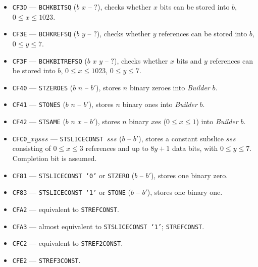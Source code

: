 \documentclass[12pt,oneside]{article}
\begin{document}
\begin{itemize}
\item {\tt CF3D} --- {\tt BCHKBITSQ} ($b$ $x$ -- $?$), checks whether $x$ bits can be stored into $b$, $0\leq x\leq 1023$.
\item {\tt CF3E} --- {\tt BCHKREFSQ} ($b$ $y$ -- $?$), checks whether $y$ references can be stored into $b$, $0\leq y\leq 7$.
\item {\tt CF3F} --- {\tt BCHKBITREFSQ} ($b$ $x$ $y$ -- $?$), checks whether $x$ bits and $y$ references can be stored into $b$, $0\leq x\leq 1023$, $0\leq y\leq 7$.
\item {\tt CF40} --- {\tt STZEROES} ($b$ $n$ -- $b'$), stores $n$ binary zeroes into {\em Builder} $b$.
\item {\tt CF41} --- {\tt STONES} ($b$ $n$ -- $b'$), stores $n$ binary ones into {\em Builder} $b$.
\item {\tt CF42} --- {\tt STSAME} ($b$ $n$ $x$ -- $b'$), stores $n$ binary $x$es ($0\leq x\leq1$) into {\em Builder} $b$.
\item {\tt CFC0\_$xysss$} --- {\tt STSLICECONST $sss$} ($b$ -- $b'$), stores a constant subslice $sss$ consisting of $0\leq x\leq 3$ references and up to $8y+1$ data bits, with $0\leq y\leq 7$. Completion bit is assumed.
\item {\tt CF81} --- {\tt STSLICECONST `0'} or {\tt STZERO} ($b$ -- $b'$), stores one binary zero.
\item {\tt CF83} --- {\tt STSLICECONST `1'} or {\tt STONE} ($b$ -- $b'$), stores one binary one.
\item {\tt CFA2} --- equivalent to {\tt STREFCONST}.
\item {\tt CFA3} --- almost equivalent to {\tt STSLICECONST `1'}; {\tt STREFCONST}.
\item {\tt CFC2} --- equivalent to {\tt STREF2CONST}.
\item {\tt CFE2} --- {\tt STREF3CONST}.
\end{itemize}
\end{document}
